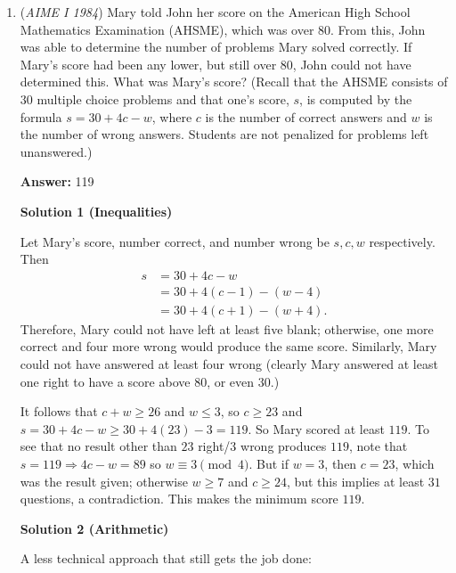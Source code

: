 \begin{enumerate}
 Finally, we calculate the distance between $\left(\frac{3}{2}, 6, 2\sqrt{3}\right)$ and $D$ to be $4$. So the height is $4$, and plugging into our tetrahedron formula we get 
 \[\frac{1}{3}\cdot 15\cdot 4 = \boxed{20}.\]

 -kilobyte144

 


	\item (\textit{AIME I 1984}) Mary told John her score on the American High School Mathematics Examination (AHSME), which was over $80$. From this, John was able to determine the number of problems Mary solved correctly. If Mary's score had been any lower, but still over $80$, John could not have determined this. What was Mary's score? (Recall that the AHSME consists of $30$ multiple choice problems and that one's score, $s$, is computed by the formula $s=30+4c-w$, where $c$ is the number of correct answers and $w$ is the number of wrong answers. Students are not penalized for problems left unanswered.)


 
 \textbf{Answer: }119



\textbf{Solution 1 (Inequalities)}

Let Mary's score, number correct, and number wrong be $s,c,w$ respectively. Then
 \begin{align*} s&=30+4c-w \\ &=30+4(c-1)-(w-4) \\ &=30+4(c+1)-(w+4). \end{align*}
Therefore, Mary could not have left at least five blank; otherwise, one more correct and four more wrong would produce the same score. Similarly, Mary could not have answered at least four wrong (clearly Mary answered at least one right to have a score above $80$, or even $30$.)

 It follows that $c+w\geq 26$ and $w\leq 3$, so $c\geq 23$ and $s=30+4c-w\geq 30+4(23)-3=119$. So Mary scored at least $119$. To see that no result other than $23$ right/$3$ wrong produces $119$, note that $s=119\Rightarrow 4c-w=89$ so $w\equiv 3\pmod{4}$. But if $w=3$, then $c=23$, which was the result given; otherwise $w\geq 7$ and $c\geq 24$, but this implies at least $31$ questions, a contradiction. This makes the minimum score $\boxed{119}$.

 



\textbf{Solution 2 (Arithmetic)}

A less technical approach that still gets the job done:


\end{enumerate}
